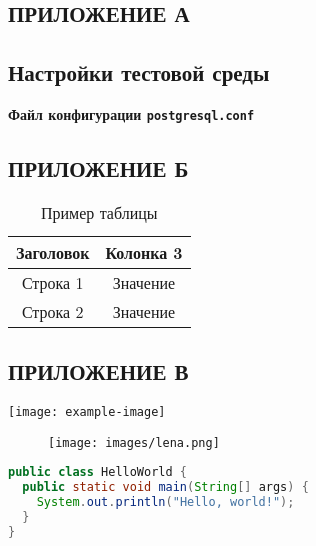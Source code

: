 \begin{center}
    \section*{ПРИЛОЖЕНИЕ А}
\end{center}

\subsection*{Настройки тестовой среды}

\label{app:postgresql_conf} %
\begin{center}
    \textbf{Файл конфигурации \texttt{postgresql.conf}}
\end{center}


\newpage


\begin{center}
    \section*{ПРИЛОЖЕНИЕ Б}
\end{center}

\begin{table}[H]

\captionsetup{justification=raggedright,singlelinecheck=false}
\caption{Пример таблицы}
\captionsetup{justification=justified,singlelinecheck=false}

\begin{tabular}{|c|c|}
\hline
\textbf{Заголовок} & \textbf{Колонка 3} \\ \hline
Строка 1           & Значение           \\ \hline
Строка 2           & Значение           \\ \hline
\end{tabular}

\end{table}


\newpage


\begin{center}
    \section*{ПРИЛОЖЕНИЕ В}
    \texttt{[image: example-image]}
\end{center}


\begin{figure}
\centering
\texttt{[image: images/lena.png]}
\end{figure}

\begin{lstlisting}[language=Java]
public class HelloWorld {
  public static void main(String[] args) {
    System.out.println("Hello, world!");
  }
}
\end{lstlisting}